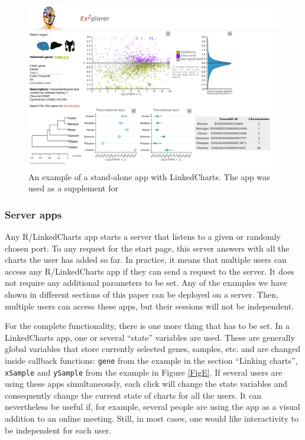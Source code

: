 \documentclass[twocolumn,10pt]{article}
\begin{document}
\begin{figure}[t]
   \includegraphics[width=\textwidth]{FigF/figF.png}
   \caption{An example of a stand-alone app with LinkedCharts. The app was used as a supplement for \citet{wang_2020}}
   \label{FigF}
\end{figure}

\subsubsection{Server apps}

Any R/LinkedCharts app starts a server that listens to a given or randomly chosen port. To any request for the start page, this server answers with all the charts the user has added so far. In practice, it means that multiple users can access any R/LinkedCharts app if they can send a request to the server. It does not require any additional parameters to be set. Any of the examples we have shown in different sections of this paper can be deployed on a server. Then, multiple users can access these apps, but their sessions will not be independent.

For the complete functionality, there is one more thing that has to be set. In a LinkedCharts app, one or several ``state'' variables are used. These are generally global variables that store currently selected genes, samples, etc. and are changed inside callback functions: \texttt{gene} from the example in the section ``Linking charts'', \texttt{xSample} and \texttt{ySample} from the example in Figure \ref{FigE}. If several users are using these apps simultaneously, each click will change the state variables and consequently change the current state of charts for all the users. It can nevertheless be useful if, for example, several people are using the app as a visual addition to an online meeting. Still, in most cases, one would like interactivity to be independent for each user.
\end{document}
